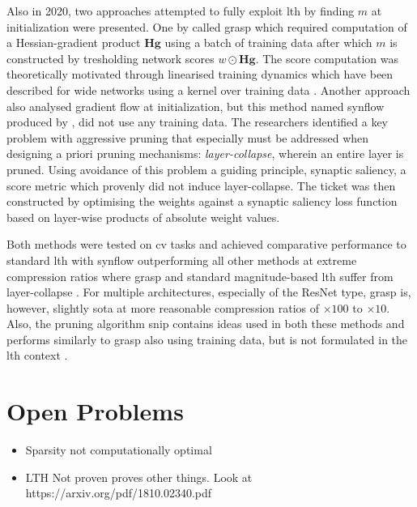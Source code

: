 \documentclass[12pt,fleqn,twocolumn]{article}
\begin{document}
Also in 2020, two approaches attempted to fully exploit \acrshort{lth} by finding $m$ at initialization were presented.
One by \textcite{Wang2020PickingWT} called \acrfull{grasp} which required computation of a Hessian-gradient product $\mathbf H \mathbf g$ using a batch of training data after which $m$ is constructed by tresholding network scores $w \odot \mathbf H \mathbf g$.
The score computation was theoretically motivated through linearised training dynamics \cite[Chap. 4.1]{Wang2020PickingWT} which have been described for wide networks using a kernel over training data \cite{Lee2019WideNN}.
Another approach also analysed gradient flow at initialization, but this method named \acrfull{synflow} produced by \textcite{Tanaka2020PruningNN}, did not use any training data.
The researchers identified a key problem with aggressive pruning that especially must be addressed when designing a priori pruning mechanisms: \emph{layer-collapse}, wherein an entire layer is pruned.
Using avoidance of this problem a guiding principle, synaptic saliency, a score metric which provenly did not induce layer-collapse.
The ticket was then constructed by optimising the weights against a synaptic saliency loss function based on layer-wise products of absolute weight values.

Both methods were tested on \acrshort{cv} tasks and achieved comparative performance to standard \acrshort{lth} with \acrshort{synflow} outperforming all other methods at extreme compression ratios where \acrshort{grasp} and standard magnitude-based \acrshort{lth} suffer from layer-collapse \cite[Chap. 7]{Tanaka2020PruningNN}.
For multiple architectures, especially of the ResNet type, \acrshort{grasp} is, however, slightly \acrshort{sota} at more reasonable compression ratios of $\times 100$ to $\times 10$\cite[Tab. 4]{Wang2020PickingWT}\cite[Fig. 6]{Tanaka2020PruningNN}.
Also, the pruning algorithm \acrfull{snip} contains ideas used in both these methods and performs similarly to \acrshort{grasp} also using training data, but is not formulated in the \acrshort{lth} context \cite{Lee2019SNIPSN}.

\section*{Open Problems}%
\label{sec:Open Problems}
\begin{itemize}
    \item Sparsity not computationally optimal
    \item LTH Not proven \cite{Tanaka2020PruningNN} proves other things. Look at https://arxiv.org/pdf/1810.02340.pdf
\end{itemize}

\clearpage
\renewcommand*{\bibfont}{\normalfont\footnotesize}
\printbibliography[heading=bibintoc]

\printglossary[type=\acronymtype]
\end{document}
